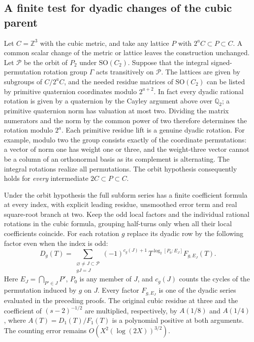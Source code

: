 \subsection*{A finite test for dyadic changes of the cubic parent}
Let $C=\mathbb Z^3$ with the cubic metric, and take any lattice $P$
with $2^aC\subset P\subset C$. A common scalar change of the metric or lattice leaves the
construction unchanged. Let $\mathcal P$
be the orbit of $P_2$ under $\mathrm{SO}(C_2)$. Suppose that the
integral signed-permutation rotation group $\Gamma$ acts transitively
on $\mathcal P$. The lattices are
given by subgroups of $C/2^aC$, and the needed residue matrices of
$\mathrm{SO}(C_2)$ can be listed by primitive quaternion coordinates
modulo $2^{a+2}$. In fact every dyadic rational rotation is given by
a quaternion by the Cayley argument above over $\mathbb Q_2$; a
primitive quaternion norm has valuation at most two. Dividing the
matrix numerators and the norm by the common power of two therefore
determines the rotation modulo $2^a$. Each primitive residue lift is
a genuine dyadic rotation. For example, modulo two the group consists
exactly of the coordinate permutations: a vector of norm one has
weight one or three, and the weight-three vector cannot be a column
of an orthonormal basis as its complement is alternating. The integral
rotations realize all permutations. The orbit hypothesis consequently
holds for \emph{every} intermediate $2C\subset P\subset C$.

\begin{corollary}\label{cor:dyadic-cubic-family}
Under the orbit hypothesis the full subform series has a finite
coefficient formula at every index, with explicit leading residue,
unsmoothed error term and real square-root branch at two.
Keep the odd local factors and the individual rational rotations in
the cubic formula, grouping half-turns only when all their local
coefficients coincide. For each rotation $g$ replace its dyadic row
by the following factor even when the index is odd:
\[
 D_g(T)=
 \sum_{\substack{\varnothing\ne J\subset\mathcal P\\gJ=J}}
 (-1)^{c_g(J)+1}\,
 T^{\log_2[P_0:E_J]}F_{g,E_J}(T).
\]
Here $E_J=\bigcap_{P'\in J}P'$, $P_0$ is any member of $J$, and
$c_g(J)$ counts the cycles of the permutation induced by $g$ on $J$.
Every factor $F_{g,E_J}$ is one of the dyadic series evaluated in
the preceding proofs. The original cubic residue at three and the
coefficient of $(s-2)^{-1/2}$ are multiplied, respectively, by
$A(1/8)$ and $A(1/4)$, where $A(T)=D_1(T)/F_1(T)$ is a polynomial
positive at both arguments. The counting error remains
$O(X^2(\log(2X))^{3/2})$.
\end{corollary}

